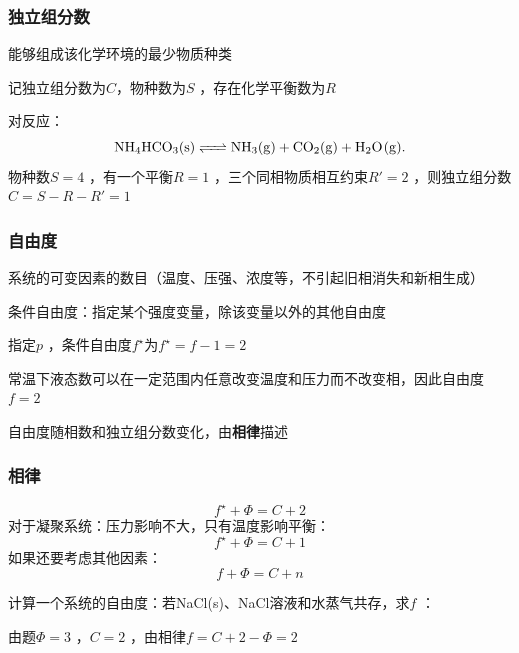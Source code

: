 \subsubsection*{独立组分数}%
\label{subsub:独立组分数}
\begin{defi}
    能够组成该化学环境的最少物质种类
\end{defi}
记独立组分数为$C$，物种数为$S$ ，存在化学平衡数为$R$
\begin{eg}
    对反应：\[
        \ce{NH_4HCO_3(s)}\ce{<=>[][]} \ce{NH_3(g)}+\ce{CO_2(g)}+\ce{H_2O(g)}
    .\]
    物种数$S=4$ ，有一个平衡$R=1$ ，三个同相物质相互约束$R'=2$ ，则独立组分数$C=S-R-R'=1$
\end{eg}
\subsubsection*{自由度}%
\label{subsub*:自由度}
系统的可变因素的数目（温度、压强、浓度等，不引起旧相消失和新相生成）
\begin{notation}
    条件自由度：指定某个强度变量，除该变量以外的其他自由度
\end{notation}
\begin{eg}
    指定$p$ ，条件自由度$f^\star $为$f^\star =f-1=2$
\end{eg}
\begin{eg}
    常温下液态数可以在一定范围内任意改变温度和压力而不改变相，因此自由度$f=2$
\end{eg}
\begin{notation}
    自由度随相数和独立组分数变化，由\textbf{相律}描述
\end{notation}
\subsubsection*{相律}%
\label{subsub*:相律}
\begin{equation}
    \label{eq:ffc2}
    f^\star + \Phi = C+2
\end{equation}
对于凝聚系统：压力影响不大，只有温度影响平衡：\begin{equation}
    \label{eq:fsfc1}
    f^\star +\Phi = C+1
\end{equation}
如果还要考虑其他因素：\begin{equation}
    \label{eq:ffcn}
    f + \Phi = C+n
\end{equation}
\begin{eg}
    计算一个系统的自由度：若NaCl(s)、NaCl溶液和水蒸气共存，求$f$ ：

    由题$\Phi=3$ ，$C=2$ ，由相律$f = C+2-\Phi = 2$
\end{eg}
